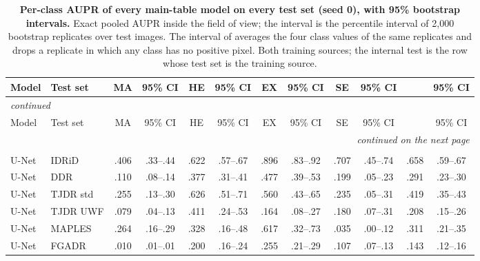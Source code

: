 \begin{landscape}
{\scriptsize\setlength{\tabcolsep}{3.2pt}\setlength{\LTcapwidth}{\textwidth}\renewcommand{\arraystretch}{1.08}
\begin{longtable}{l l c c c c c c c c c c}
\caption{\textbf{Per-class AUPR of every main-table model on every test set (seed 0), with 95\% bootstrap intervals.} Exact pooled AUPR inside the field of view; the interval is the percentile interval of 2,000 bootstrap replicates over test images. The interval of \mAUPR{} averages the four class values of the same replicates and drops a replicate in which any class has no positive pixel. Both training sources; the internal test is the row whose test set is the training source.}\label{stab:perclass}\\
\toprule
Model & Test set & MA & 95\% CI & HE & 95\% CI & EX & 95\% CI & SE & 95\% CI & \mAUPR{} & 95\% CI \\
\midrule
\endfirsthead
\multicolumn{12}{l}{\textit{continued}}\\
\toprule
Model & Test set & MA & 95\% CI & HE & 95\% CI & EX & 95\% CI & SE & 95\% CI & \mAUPR{} & 95\% CI \\
\midrule
\endhead
\midrule
\multicolumn{12}{r}{\textit{continued on the next page}}\\
\endfoot
\bottomrule
\endlastfoot
\multicolumn{12}{l}{\textbf{Trained on IDRiD}}\\
U-Net & IDRiD & .406 & \scriptsize .33--.44 & .622 & \scriptsize .57--.67 & .896 & \scriptsize .83--.92 & .707 & \scriptsize .45--.74 & .658 & \scriptsize .59--.67 \\
U-Net & DDR & .110 & \scriptsize .08--.14 & .377 & \scriptsize .31--.41 & .477 & \scriptsize .39--.53 & .199 & \scriptsize .05--.23 & .291 & \scriptsize .23--.30 \\
U-Net & TJDR std & .255 & \scriptsize .13--.30 & .626 & \scriptsize .51--.71 & .560 & \scriptsize .43--.65 & .235 & \scriptsize .05--.31 & .419 & \scriptsize .35--.43 \\
U-Net & TJDR UWF & .079 & \scriptsize .04--.13 & .411 & \scriptsize .24--.53 & .164 & \scriptsize .08--.27 & .180 & \scriptsize .07--.31 & .208 & \scriptsize .15--.26 \\
U-Net & MAPLES & .264 & \scriptsize .16--.29 & .328 & \scriptsize .16--.48 & .617 & \scriptsize .32--.73 & .035 & \scriptsize .00--.12 & .311 & \scriptsize .21--.35 \\
U-Net & FGADR & .010 & \scriptsize .01--.01 & .200 & \scriptsize .16--.24 & .255 & \scriptsize .21--.29 & .107 & \scriptsize .07--.13 & .143 & \scriptsize .12--.16 \\

\end{longtable}}
\end{landscape}
